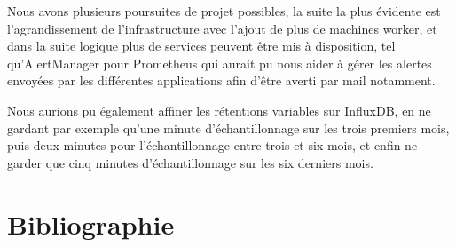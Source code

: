 \documentclass[oneside,12pt]{report}
\begin{document}
Nous avons plusieurs poursuites de projet possibles, la suite la plus évidente est l'agrandissement de l'infrastructure avec l'ajout de plus de machines worker, et dans la suite logique plus de services peuvent être mis à disposition, tel qu'AlertManager pour Prometheus qui aurait pu nous aider à gérer les alertes envoyées par les différentes applications afin d'être averti par mail notamment. \newline

Nous aurions pu également affiner les rétentions variables sur InfluxDB, en ne gardant par exemple qu'une minute d'échantillonnage sur les trois premiers mois, puis deux minutes pour l'échantillonnage entre trois et six mois, et enfin ne garder que cinq minutes d'échantillonnage sur les six derniers mois.

\chapter{Bibliographie}
\end{document}
